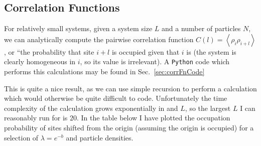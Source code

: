 \subsection{Correlation Functions}
For relatively small systems, given a system size $L$ and a number of particles $N$, we can analytically compute the pairwise correlation function $C(l) = \left\langle \rho_i \rho_{i+l} \right\rangle$, or ``the probability that site $i+l$
is occupied given that $i$ is (the system is clearly homogeneous in $i$, so its value is irrelevant).
A \texttt{Python} code which performs this calculations may be found in Sec.~\ref{sec:corrFnCode}


This is quite a nice result, as we can use simple recursion to perform a calculation which would otherwise be quite difficult to code.
Unfortunately the time complexity of the calculation grows exponentially in and $L$, so the largest $L$ I can reasonably run for is $20$. In the table below I have plotted the occupation probability of sites shifted from the origin
(assuming the origin is occupied)  for a selection of $\lambda = e^{-b}$ and particle densities.

